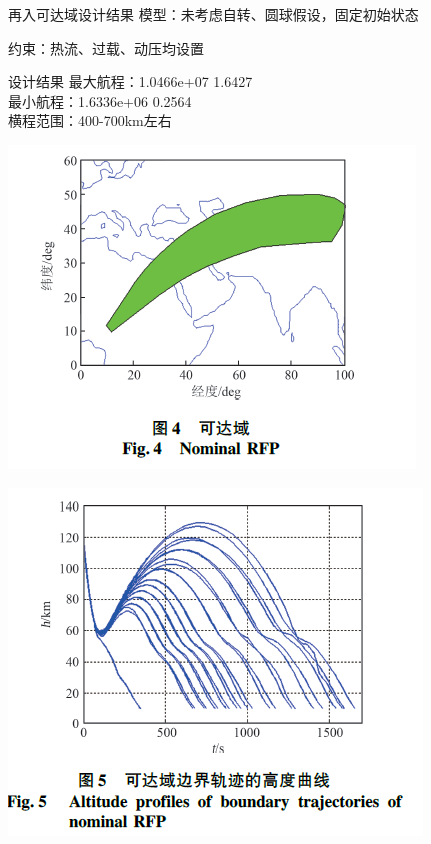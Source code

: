 \documentclass[11pt,UTF8]{ctexbeamer}
\begin{document}
\begin{frame}{再入可达域设计结果}
	模型：未考虑自转、圆球假设，固定初始状态

	约束：热流、过载、动压均设置
	\begin{block}{设计结果}
		最大航程：1.0466e+07    1.6427\\
		最小航程：1.6336e+06    0.2564\\
		横程范围：400-700km左右\\
		\begin{minipage}{0.4\linewidth}
			\centering
			\includegraphics[height=.4\textheight]{nominal_RFP.png}
		\end{minipage}
		\hspace{1cm}
		\begin{minipage}{0.4\linewidth}
			\centering
			\includegraphics[height=.4\textheight]{RFP_altitude_profile.png}
		\end{minipage}
	\end{block}
\end{frame}
\end{document}
